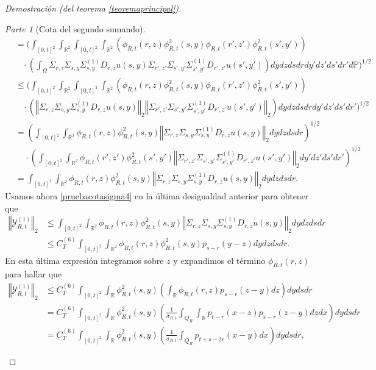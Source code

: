 \documentclass[letterpaper,twoside,12pt]{book}
\newcommand{\R}{\mathbb{R}}
\renewcommand{\P}{\mathbb{P}}
\newcommand{\1}{\mathds{1}}
\newcommand{\norm}[1]{\left\Vert #1 \right\Vert}
\theoremstyle{definition}
\theoremstyle{definition}
\theoremstyle{remark}
\newtheorem{proofpart}{Parte}
\theoremstyle{definition}
\theoremstyle{definition}
\theoremstyle{definition}
\theoremstyle{definition}
\theoremstyle{definition}
\begin{document}
\begin{proof}[Demostración (del teorema \ref{teoremaprincipal})]
\begin{proofpart}[Cota del segundo sumando]
\begin{align*}
   &=\Bigg(\int_{[0,t]^2}\int_{\R^2}\int_{[0,t]^2}\int_{\R^2}\left(\phi_{R,t}(r,z)\phi_{R,t}^2(s,y)\phi_{R,t}(r',z')\phi_{R,t}^2(s',y')\right)\\
   &\ \ \ \ \cdot \left(\int_\Omega\Sigma_{r,z}\Sigma_{s,y}\Sigma^{(1)}_{s,y}D_{r,z}u(s,y)\Sigma_{r',z'}\Sigma_{s',y'}\Sigma^{(1)}_{s',y'}D_{r',z'}u(s',y')\right) dy dz ds dr dy'dz'ds'dr'd\P\Bigg)^{1/2}\\
   &\leq \Bigg(\int_{[0,t]^2}\int_{\R^2}\int_{[0,t]^2}\int_{\R^2}\left(\phi_{R,t}(r,z)\phi_{R,t}^2(s,y)\phi_{R,t}(r',z')\phi_{R,t}^2(s',y')\right)\\
   &\ \ \ \ \cdot \left(\norm{\Sigma_{r,z}\Sigma_{s,y}\Sigma^{(1)}_{s,y}D_{r,z}u(s,y)}_2\norm{\Sigma_{r',z'}\Sigma_{s',y'}\Sigma^{(1)}_{s',y'}D_{r',z'}u(s',y')}_2\right) dy dz ds dr dy' dz' ds' dr'\Bigg)^{1/2}\\
   &=\left(\int_{[0,t]^2}\int_{\R^2}\phi_{R,t}(r,z)\phi_{R,t}^2(s,y)\norm{\Sigma_{r,z}\Sigma_{s,y}\Sigma^{(1)}_{s,y}D_{r,z}u(s,y)}_2dy dz ds dr\right)^{1/2}\\
   & \ \ \ \ \ \cdot \left(\int_{[0,t]^2}\int_{\R^2}\phi_{R,t}(r',z')\phi_{R,t}^2(s',y')\norm{\Sigma_{r',z'}\Sigma_{s',y'}\Sigma^{(1)}_{s',y'}D_{r',z'}u(s',y')}_2dy'dz'ds'dr'\right)^{1/2}\\
   &=\int_{[0,t]^2}\int_{\R^2}\phi_{R,t}(r,z)\phi_{R,t}^2(s,y)\norm{\Sigma_{r,z}\Sigma_{s,y}\Sigma^{(1)}_{s,y}D_{r,z}u(s,y)}_2dy dz ds dr.
 \end{align*}
 Usamos ahora \eqref{pruebacotasigma4} en la última desigualdad anterior para obtener que
 \begin{align*}
   \norm{\mathcal{Y}_{R,t}^{(1)}}_2&\leq\int_{[0,t]^2}\int_{\R^2}\phi_{R,t}(r,z)\phi_{R,t}^2(s,y)\norm{\Sigma_{r,z}\Sigma_{s,y}\Sigma^{(1)}_{s,y}D_{r,z}u(s,y)}_2dy dz ds dr\\
   &\leq C^{(6)}_T\int_{[0,t]^2}\int_{\R^2}\phi_{R,t}(r,z)\phi_{R,t}^2(s,y)p_{s-r}(y-z)dy dz ds dr.
\end{align*}
En esta última expresión integramos sobre $z$ y expandimos el término $\phi_{R,t}(r,z)$ para hallar que 
\begin{align*}
   \norm{\mathcal{Y}_{R,t}^{(1)}}_2&\leq C^{(6)}_T\int_{[0,t]^2}\int_{\R}\phi_{R,t}^2(s,y)\left(\int_\R\phi_{R,t}(r,z)p_{s-r}(z-y)dz\right)dy ds dr\\
   &=C^{(6)}_T\int_{[0,t]^2}\int_{\R}\phi_{R,t}^2(s,y)\left(\frac{1}{\sigma_{R,t}}\int_{Q_R}\int_\R p_{t-r}(x-z)p_{s-r}(z-y)dz dx\right)dy ds dr\\
   &=C^{(6)}_T\int_{[0,t]^2}\int_{\R}\phi_{R,t}^2(s,y)\left(\frac{1}{\sigma_{R,t}}\int_{Q_R}p_{t+s-2r}(x-y)dx\right)dy ds dr,

\end{align*}
\end{proofpart}
\end{proof}
\end{document}
